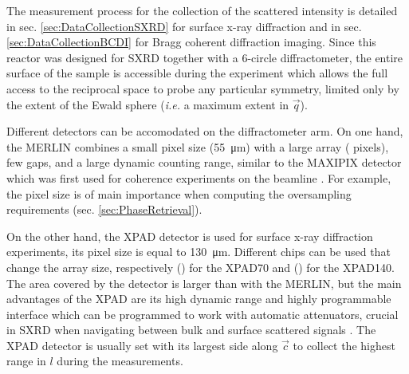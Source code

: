 The measurement process for the collection of the scattered intensity is detailed in sec. \ref{sec:DataCollectionSXRD} for surface x-ray diffraction and in sec. \ref{sec:DataCollectionBCDI} for Bragg coherent diffraction imaging.
Since this reactor was designed for SXRD together with a 6-circle diffractometer, the entire surface of the sample is accessible during the experiment which allows the full access to the reciprocal space to probe any particular symmetry, limited only by the extent of the Ewald sphere (\textit{i.e.} a maximum extent in $\vec{q}$).

Different detectors can be accomodated on the diffractometer arm.
On one hand, the MERLIN \parencite{BEWLEY20061029} combines a small pixel size (\qty{55}{\um}) with a large array ( pixels), few gaps, and a large dynamic counting range, similar to the MAXIPIX detector \parencite{ponchut_maxipix_2011} which was first used for coherence experiments on the beamline \parencite{Schavkan2013, Li2020}.
For example, the pixel size is of main importance when computing the oversampling requirements (sec. \ref{sec:PhaseRetrieval}).

On the other hand, the XPAD detector \parencite{Basolo2005, Dawiec_2016} is used for surface x-ray diffraction experiments, its pixel size is equal to \qty{130}{\um}.
Different chips can be used that change the array size, respectively () for the XPAD70 and () for the XPAD140.
The area covered by the detector is larger than with the MERLIN, but the main advantages of the XPAD are its high dynamic range and highly programmable interface \parencite{Fertey2013} which can be programmed to work with automatic attenuators, crucial in SXRD when navigating between bulk and surface scattered signals .
The XPAD detector is usually set with its largest side along $\vec{c}$ to collect the highest range in $l$ during the measurements.